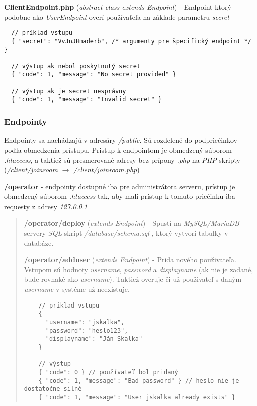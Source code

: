\documentclass{article}
\newcommand{\filedesc}[1]{\vspace{0.3cm} \noindent \textbf{#1}}
\newcommand{\file}[1]{\emph{#1}}
\begin{document}
\filedesc{ClientEndpoint.php} (\emph{abstract class extends Endpoint}) - Endpoint ktorý podobne ako \emph{UserEndpoint} overí používaťeľa na základe parametru \emph{secret}

\begin{verbatim}
  // príklad vstupu
  { "secret": "VvJnJHmaderb", /* argumenty pre špecifický endpoint */ }
  
  // výstup ak nebol poskytnutý secret
  { "code": 1, "message": "No secret provided" }
  
  // výstup ak je secret nesprávny
  { "code": 1, "message": "Invalid secret" }
\end{verbatim}

\subsubsection{Endpointy}

Endpointy sa nachádzajú v adresáry \emph{/public}. Sú rozdelené do podpriečinkov poďla obmedzenia prístupu. Pristup k endpointom je obmedzený súborom \emph{.htaccess}, a taktiež sú presmerované adresy bez prípony \emph{.php} na \emph{PHP} skripty (\emph{/client/joinroom} $\rightarrow$ \emph{/client/joinroom.php})

\filedesc{/operator} - endpointy dostupné iba pre administrátora serveru, prístup je obmedzený súborom \emph{.htaccess} tak, aby mali prístup k tomuto priečinku iba requesty z adresy \emph{127.0.0.1}

\begin{quote}
  \filedesc{/operator/deploy} (\emph{extends Endpoint}) - Spustí na \emph{MySQL/MariaDB} servery \emph{SQL} skript \file{/database/schema.sql} , ktorý vytvorí tabulky v databáze.
  
  \filedesc{/operator/adduser} (\emph{extends Endpoint}) - Prida nového použivateľa. Vstupom sú hodnoty \emph{username}, \emph{password} a \emph{displayname} (ak nie je zadané, bude rovnaké ako \emph{username}). Taktiež overuje či už použivateľ s daným \emph{username} v systéme už neexistuje.

  \begin{verbatim}
    // príklad vstupu
    {
      "username": "jskalka",
      "password": "heslo123",
      "displayname": "Ján Skalka"
    }

    // výstup
    { "code": 0 } // používateľ bol pridaný
    { "code": 1, "message": "Bad password" } // heslo nie je dostatočne silné
    { "code": 1, "message": "User jskalka already exists" }
  \end{verbatim}
\end{quote}
\end{document}
